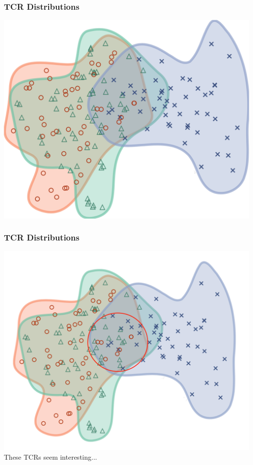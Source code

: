 \documentclass[mathserif,compress,xcolor={dvipsnames}]{beamer}
\renewcommand\;{\,}
\begin{document}
\begin{frame}\frametitle{TCR Distributions}
\begin{center}
\includegraphics[width=0.8\linewidth]{Figures/TCRDistributions.png}
\end{center}
\end{frame}

\begin{frame}\frametitle{TCR Distributions}
\begin{center}
\includegraphics[width=0.8\linewidth]{Figures/TCR_shared.png}
\\
These TCRs seem interesting...
\end{center}
\end{frame}
\end{document}
